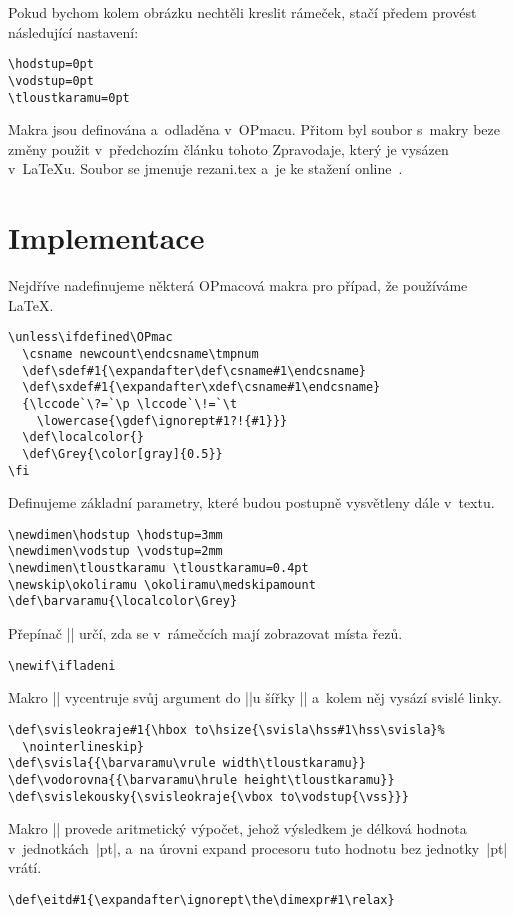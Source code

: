 \documentclass{csbulletin}
\def\p#1{\texttt{\char`\\#1}}
\def\soub#1{{\sf#1}}
\def\barvaramu{\color[cmyk]{0,0,0,0.4}}
\begin{document}
Pokud bychom kolem obrázku nechtěli kreslit rámeček, stačí předem provést následující nastavení:
\begin{Verbatim}[numbers=none]
\hodstup=0pt
\vodstup=0pt
\tloustkaramu=0pt
\end{Verbatim}

Makra jsou definována a~odladěna v~OPmacu. Přitom byl soubor s~makry beze změny použit v~předchozím článku tohoto Zpravodaje, který je vysázen v~\LaTeX u. Soubor se jmenuje \soub{rezani.tex} a~je ke stažení online~\cite{rezaniweb}.


\section{Implementace}
\label{S81}

Nejdříve nadefinujeme některá OPmacová makra pro případ, že používáme \LaTeX.

\begin{Verbatim}[firstnumber=auto]
\unless\ifdefined\OPmac
  \csname newcount\endcsname\tmpnum
  \def\sdef#1{\expandafter\def\csname#1\endcsname}
  \def\sxdef#1{\expandafter\xdef\csname#1\endcsname}
  {\lccode`\?=`\p \lccode`\!=`\t
    \lowercase{\gdef\ignorept#1?!{#1}}}
  \def\localcolor{}
  \def\Grey{\color[gray]{0.5}}
\fi
\end{Verbatim}

Definujeme základní parametry, které budou postupně vysvětleny dále v~textu.
\begin{Verbatim}
\newdimen\hodstup \hodstup=3mm
\newdimen\vodstup \vodstup=2mm
\newdimen\tloustkaramu \tloustkaramu=0.4pt
\newskip\okoliramu \okoliramu\medskipamount
\def\barvaramu{\localcolor\Grey}
\end{Verbatim}

Přepínač |\ifladeni| určí, zda se v~rámečcích mají zobrazovat místa řezů.
\begin{Verbatim}
\newif\ifladeni
\end{Verbatim}

Makro |\svisleokraje| vycentruje svůj argument do |\hbox|u šířky |\hsize| a~kolem něj vysází svislé linky.
\begin{Verbatim}
\def\svisleokraje#1{\hbox to\hsize{\svisla\hss#1\hss\svisla}%
  \nointerlineskip}
\def\svisla{{\barvaramu\vrule width\tloustkaramu}}
\def\vodorovna{{\barvaramu\hrule height\tloustkaramu}}
\def\svislekousky{\svisleokraje{\vbox to\vodstup{\vss}}}
\end{Verbatim}

Makro |\eitd| provede aritmetický výpočet, jehož výsledkem je délková hodnota v~jednotkách~|pt|, a~na úrovni expand procesoru tuto hodnotu bez jednotky~|pt| vrátí.
\begin{Verbatim}
\def\eitd#1{\expandafter\ignorept\the\dimexpr#1\relax}
\end{Verbatim}
\end{document}
